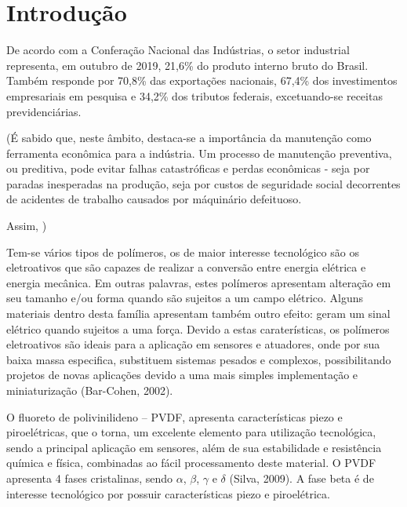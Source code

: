 \documentclass[
	12pt,				
	oneside,			
	a4paper,			
	english,			
	brazil				
	]{abntex2ppgsi}
\begin{document}
\textual




\chapter{Introdução}
De acordo com a Conferação Nacional das Indústrias, o setor industrial representa, em outubro de 2019, 21,6\% do produto interno bruto do Brasil. Também responde por 70,8\% das exportações nacionais, 67,4\% dos investimentos empresariais em pesquisa  e 34,2\% dos tributos federais, excetuando-se receitas previdenciárias. 

(É sabido que, neste âmbito, destaca-se a importância da manutenção como ferramenta econômica para a indústria. Um processo de manutenção preventiva, ou preditiva, pode evitar falhas catastróficas e perdas econômicas - seja por paradas inesperadas na produção, seja por custos de seguridade social decorrentes de acidentes de trabalho causados por máquinário defeituoso.

Assim, ) 

Tem-se vários tipos de polímeros, os de maior interesse tecnológico são os eletroativos que são capazes de realizar a conversão entre energia elétrica e energia mecânica. Em outras palavras, estes polímeros apresentam alteração em seu tamanho e/ou forma quando são sujeitos a um campo elétrico. Alguns  materiais dentro desta família apresentam também outro efeito: geram um sinal elétrico quando sujeitos a uma força. Devido a estas caraterísticas, os polímeros eletroativos são ideais para a aplicação em sensores e atuadores, onde por sua baixa massa especifica, substituem sistemas pesados e complexos, possibilitando projetos de novas aplicações devido a uma mais simples implementação e miniaturização (Bar-Cohen, 2002).

O fluoreto de polivinilideno – PVDF, apresenta características piezo e piroelétricas, que o torna, um excelente elemento para utilização tecnológica, sendo a principal aplicação em sensores, além de sua estabilidade e resistência química e física, combinadas ao fácil processamento deste material. O PVDF apresenta 4 fases cristalinas, sendo $\alpha$, $\beta$, $\gamma$ e $\delta$ (Silva, 2009). A fase beta é de interesse tecnológico por possuir características piezo e piroelétrica.
\end{document}

